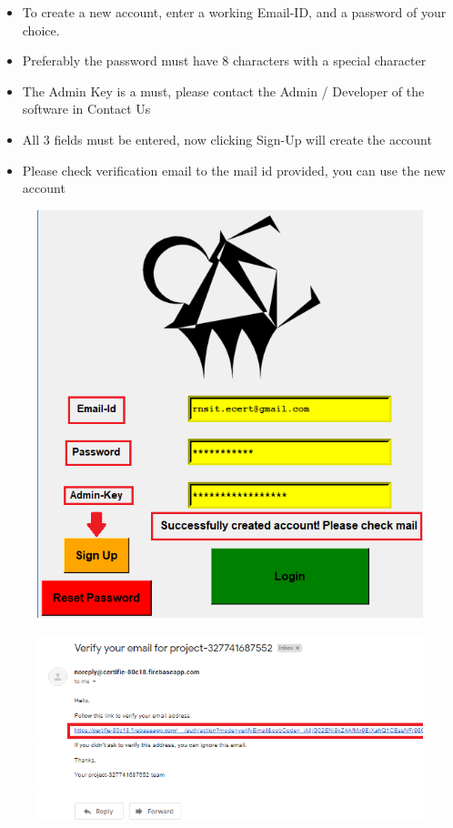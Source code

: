 \begin{itemize}
	\item To create a new account, enter a working Email-ID, and a password of your choice.
	\item Preferably the password must have 8 characters with a special character
	\item The Admin Key is a must, please contact the Admin / Developer of the software in Contact Us
	\item All 3 fields must be entered, now clicking Sign-Up will create the account
	\item Please check verification email to the mail id provided, you can use the new account
\end{itemize}
\begin{figure}[H]
	\centering
	\includegraphics[width=0.6\linewidth]{images/login_page/login_4}
	\label{fig:login4}
\end{figure}

\begin{figure}[H]
	\centering
	\includegraphics[width=0.9\linewidth]{images/login_page/login_6}
	\label{fig:login6}
\end{figure}

